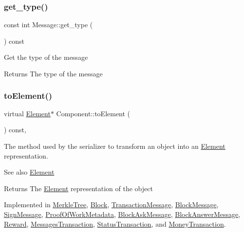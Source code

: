 \subsubsection{\texorpdfstring{get\+\_\+type()}{get\_type()}}
{\footnotesize\ttfamily const int Message\+::get\+\_\+type (\begin{DoxyParamCaption}{ }\end{DoxyParamCaption}) const}

Get the type of the message

\begin{DoxyReturn}{Returns}
The type of the message 
\end{DoxyReturn}
\mbox{\label{classComponent_a3e63d8c993e417a4af3f56d65ebfc7ea}} 
\subsubsection{\texorpdfstring{to\+Element()}{toElement()}}
{\footnotesize\ttfamily virtual \mbox{\hyperlink{classElement}{Element}}$\ast$ Component\+::to\+Element (\begin{DoxyParamCaption}{ }\end{DoxyParamCaption}) const\hspace{0.3cm}{\ttfamily [pure virtual]}, {\ttfamily [inherited]}}

The method used by the serializer to transform an object into an \mbox{\hyperlink{classElement}{Element}} representation. \begin{DoxySeeAlso}{See also}
\mbox{\hyperlink{classElement}{Element}}
\end{DoxySeeAlso}
\begin{DoxyReturn}{Returns}
The \mbox{\hyperlink{classElement}{Element}} representation of the object 
\end{DoxyReturn}


Implemented in \mbox{\hyperlink{classMerkleTree_a4e72819c6cbc49ed8ce092f464711a5f}{Merkle\+Tree}}, \mbox{\hyperlink{classBlock_aa289363a40f0d3ba88720ad0bc71f34f}{Block}}, \mbox{\hyperlink{classTransactionMessage_ae20e7d6a7b5811bb56a32ec6af59b8e2}{Transaction\+Message}}, \mbox{\hyperlink{classBlockMessage_ab47afd5cfb7d6d5c544d8def5d0f9737}{Block\+Message}}, \mbox{\hyperlink{classSignMessage_aee897c4bf78df966b8cca95e589566e4}{Sign\+Message}}, \mbox{\hyperlink{classProofOfWorkMetadata_a2aab4c26afb3a85a712cc065028274d9}{Proof\+Of\+Work\+Metadata}}, \mbox{\hyperlink{classBlockAskMessage_a0bc20076f19423855ab5772003fb65f6}{Block\+Ask\+Message}}, \mbox{\hyperlink{classBlockAnswerMessage_ac7f35ec9f7f2fbcd726628c2a984518b}{Block\+Answer\+Message}}, \mbox{\hyperlink{classReward_a0ecd536148463880f9980fe415b6eb1d}{Reward}}, \mbox{\hyperlink{classMessagesTransaction_a0ef8ec080a2698a02ad8b1b95d243720}{Messages\+Transaction}}, \mbox{\hyperlink{classStatusTransaction_aed42f2d61f2d50ec07bb6b35473f61f2}{Status\+Transaction}}, and \mbox{\hyperlink{classMoneyTransaction_a84adc847266467965014cb04acd48bea}{Money\+Transaction}}.




